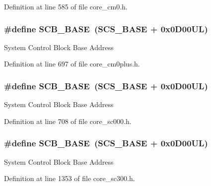 Definition at line 585 of file core\+\_\+cm0.\+h.

\subsubsection[{\texorpdfstring{S\+C\+B\+\_\+\+B\+A\+SE}{SCB_BASE}}]{\setlength{\rightskip}{0pt plus 5cm}\#define S\+C\+B\+\_\+\+B\+A\+SE~({\bf S\+C\+S\+\_\+\+B\+A\+SE} +  0x0\+D00\+U\+L)}\hypertarget{group___c_m_s_i_s__core__base_gad55a7ddb8d4b2398b0c1cfec76c0d9fd}{}\label{group___c_m_s_i_s__core__base_gad55a7ddb8d4b2398b0c1cfec76c0d9fd}
System Control Block Base Address 

Definition at line 697 of file core\+\_\+cm0plus.\+h.

\subsubsection[{\texorpdfstring{S\+C\+B\+\_\+\+B\+A\+SE}{SCB_BASE}}]{\setlength{\rightskip}{0pt plus 5cm}\#define S\+C\+B\+\_\+\+B\+A\+SE~({\bf S\+C\+S\+\_\+\+B\+A\+SE} +  0x0\+D00\+U\+L)}\hypertarget{group___c_m_s_i_s__core__base_gad55a7ddb8d4b2398b0c1cfec76c0d9fd}{}\label{group___c_m_s_i_s__core__base_gad55a7ddb8d4b2398b0c1cfec76c0d9fd}
System Control Block Base Address 

Definition at line 708 of file core\+\_\+sc000.\+h.

\subsubsection[{\texorpdfstring{S\+C\+B\+\_\+\+B\+A\+SE}{SCB_BASE}}]{\setlength{\rightskip}{0pt plus 5cm}\#define S\+C\+B\+\_\+\+B\+A\+SE~({\bf S\+C\+S\+\_\+\+B\+A\+SE} +  0x0\+D00\+U\+L)}\hypertarget{group___c_m_s_i_s__core__base_gad55a7ddb8d4b2398b0c1cfec76c0d9fd}{}\label{group___c_m_s_i_s__core__base_gad55a7ddb8d4b2398b0c1cfec76c0d9fd}
System Control Block Base Address 

Definition at line 1353 of file core\+\_\+sc300.\+h.

